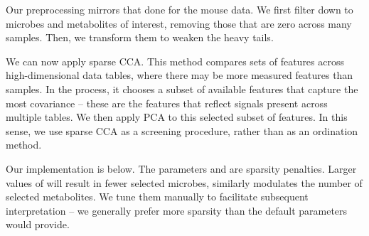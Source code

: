 Our preprocessing mirrors that done for the mouse data. We first
filter down to microbes and metabolites of interest, removing those that
are zero across many samples. Then, we transform them to weaken the
heavy tails.

\begin{knitrout}
\color{fgcolor}\begin{kframe}
\begin{alltt}
 \hlkwb{<-}  \hlopt{==} \hlstd{)} \hlopt{<=} 
 \hlkwb{<-} 
 \hlkwb{<-} \hlstd{(} \hlopt{>} 
 \hlkwb{<-}  \hlstd{(}\hlstd{(}\hlstd{,} \hlstd{)),} \hlstd{)}

 \hlkwb{<-} \hlstd{(} \hlopt{+}   \hlstd{=} \hlstd{)}
 \hlkwb{<-} 
\hlstd{X[X} \hlopt{>} \hlstd{]} \hlkwb{<-} 
\end{alltt}
\end{kframe}
\end{knitrout}

We can now apply sparse CCA. This method compares sets of
features across high-dimensional data tables, where there may be
more measured features than samples. In the process, it chooses a
subset of available features that capture the most covariance -- these
are the features that reflect signals present across multiple
tables. We then apply PCA to this selected subset of features. In this
sense, we use sparse CCA as a screening procedure, rather than as an
ordination method.

Our implementation is below. The parameters  and
 are sparsity penalties. Larger values of
 will result in fewer selected  microbes, similarly
 modulates the number of selected metabolites. We
tune them manually to facilitate subsequent interpretation -- we
generally prefer more sparsity than the default parameters would
provide.


